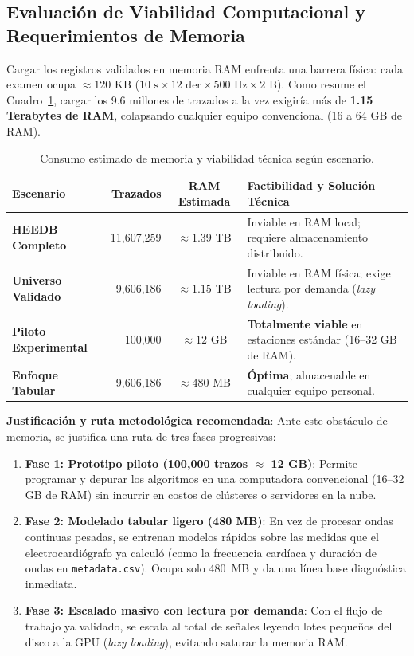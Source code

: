 \documentclass[11pt,a4paper]{article}
\begin{document}
\subsection{Evaluación de Viabilidad Computacional y Requerimientos de Memoria}
Cargar los registros validados en memoria RAM enfrenta una barrera física: cada examen ocupa $\approx 120\text{ KB}$ ($10\text{ s} \times 12\text{ der} \times 500\text{ Hz} \times 2\text{ B}$). Como resume el Cuadro~\ref{tab:viabilidad}, cargar los 9.6 millones de trazados a la vez exigiría más de \textbf{1.15 Terabytes de RAM}, colapsando cualquier equipo convencional (16 a 64 GB de RAM).

\begin{table}[htbp]
\centering
\small
\renewcommand{\arraystretch}{1.12}
\begin{tabularx}{\textwidth}{@{} l r c X @{}}
\toprule
\textbf{Escenario} & \textbf{Trazados} & \textbf{RAM Estimada} & \textbf{Factibilidad y Solución Técnica} \\
\midrule
\textbf{HEEDB Completo}        & 11,607,259 & $\approx 1.39$ TB & Inviable en RAM local; requiere almacenamiento distribuido. \\
\textbf{Universo Validado}     &  9,606,186 & $\approx 1.15$ TB & Inviable en RAM física; exige lectura por demanda (\textit{lazy loading}). \\
\textbf{Piloto Experimental}   &   100,000 & $\approx 12$ GB  & \textbf{Totalmente viable} en estaciones estándar (16--32 GB de RAM). \\
\textbf{Enfoque Tabular}       &  9,606,186 & $\approx 480$ MB & \textbf{Óptima}; almacenable en cualquier equipo personal. \\
\bottomrule
\end{tabularx}
\caption{Consumo estimado de memoria y viabilidad técnica según escenario.}
\label{tab:viabilidad}
\end{table}

\textbf{Justificación y ruta metodológica recomendada}:
Ante este obstáculo de memoria, se justifica una ruta de tres fases progresivas:
\begin{enumerate}[topsep=1pt, itemsep=1pt, parsep=0pt]
    \item \textbf{Fase 1: Prototipo piloto (100,000 trazos $\approx$ 12 GB)}: Permite programar y depurar los algoritmos en una computadora convencional (16--32 GB de RAM) sin incurrir en costos de clústeres o servidores en la nube.
    \item \textbf{Fase 2: Modelado tabular ligero (480 MB)}: En vez de procesar ondas continuas pesadas, se entrenan modelos rápidos sobre las medidas que el electrocardiógrafo ya calculó (como la frecuencia cardíaca y duración de ondas en \nolinkurl{metadata.csv}). Ocupa solo 480~MB y da una línea base diagnóstica inmediata.
    \item \textbf{Fase 3: Escalado masivo con lectura por demanda}: Con el flujo de trabajo ya validado, se escala al total de señales leyendo lotes pequeños del disco a la GPU (\textit{lazy loading}), evitando saturar la memoria RAM.
\end{enumerate}
\end{document}
